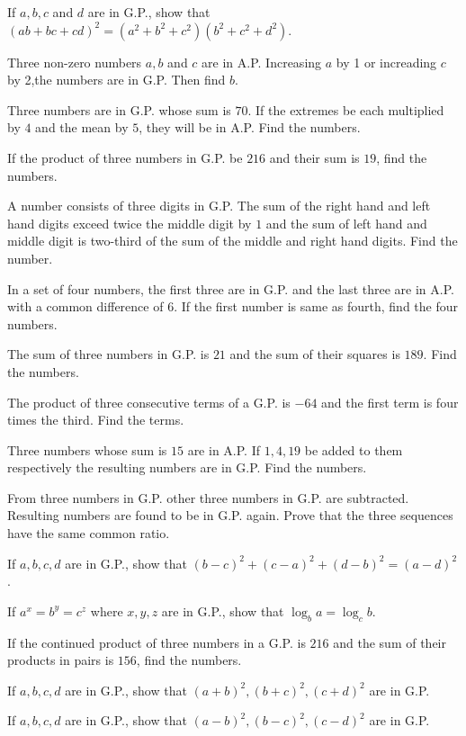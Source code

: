 \item If $a, b, c$ and $d$ are in G.P., show that $(ab + bc + cd)^2 = (a^2 + b^2 + c^2)(b^2 + c^2 + d^2)$.
\item Three non-zero numbers $a, b$ and $c$ are in A.P. Increasing $a$ by 1 or increading $c$ by 2,the numbers are in G.P. Then
  find $b$.
\item Three numbers are in G.P. whose sum is $70$. If the extremes be each multiplied by $4$ and the mean by $5$, they will be in
  A.P. Find the numbers.
\item If the product of three numbers in G.P. be $216$ and their sum is $19$, find the numbers.
\item A number consists of three digits in G.P. The sum of the right hand and left hand digits exceed twice the middle digit by $1$
  and the sum of left hand and middle digit is two-third of the sum of the middle and right hand digits. Find the number.
\item In a set of four numbers, the first three are in G.P. and the last three are in A.P. with a common difference of $6$. If the
  first number is same as fourth, find the four numbers.
\item The sum of three numbers in G.P. is $21$ and the sum of their squares is $189$. Find the numbers.
\item The product of three consecutive terms of a G.P. is $-64$ and the first term is four times the third. Find the terms.
\item Three numbers whose sum is $15$ are in A.P. If $1, 4, 19$ be added to them respectively the resulting numbers are in
  G.P. Find the numbers.
\item From three numbers in G.P. other three numbers in G.P. are subtracted. Resulting numbers are found to be in G.P. again. Prove
  that the three sequences have the same common ratio.
\item If $a, b, c, d$ are in G.P., show that $(b - c)^2 + (c - a)^2 + (d - b)^2 = (a - d)^2$.
\item If $a^x = b^y = c^z$ where $x, y, z$ are in G.P., show that $\log_ba = \log_cb$.
\item If the continued product of three numbers in a G.P. is $216$ and the sum of their products in pairs is $156$, find the
  numbers.
\item If $a, b, c, d$ are in G.P., show that $(a + b)^2, (b + c)^2, (c + d)^2$ are in G.P.
\item If $a, b, c, d$ are in G.P., show that $(a - b)^2, (b - c)^2, (c - d)^2$ are in G.P.
